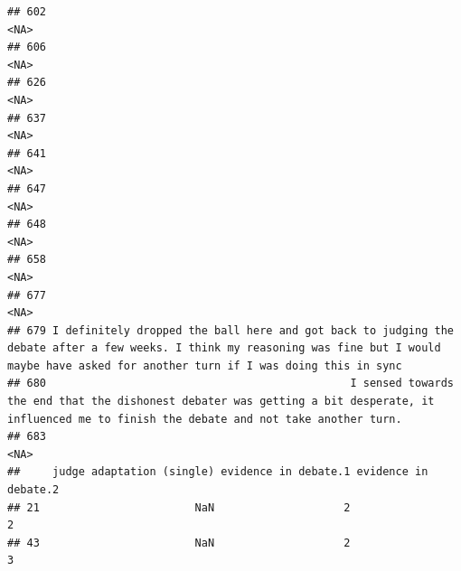 \documentclass[
]{article}
\begin{document}
\begin{verbatim}
## 602                                                                                                                                                                                             <NA>
## 606                                                                                                                                                                                             <NA>
## 626                                                                                                                                                                                             <NA>
## 637                                                                                                                                                                                             <NA>
## 641                                                                                                                                                                                             <NA>
## 647                                                                                                                                                                                             <NA>
## 648                                                                                                                                                                                             <NA>
## 658                                                                                                                                                                                             <NA>
## 677                                                                                                                                                                                             <NA>
## 679 I definitely dropped the ball here and got back to judging the debate after a few weeks. I think my reasoning was fine but I would maybe have asked for another turn if I was doing this in sync
## 680                                               I sensed towards the end that the dishonest debater was getting a bit desperate, it influenced me to finish the debate and not take another turn. 
## 683                                                                                                                                                                                             <NA>
##     judge adaptation (single) evidence in debate.1 evidence in debate.2
## 21                        NaN                    2                    2
## 43                        NaN                    2                    3

\end{verbatim}
\end{document}
